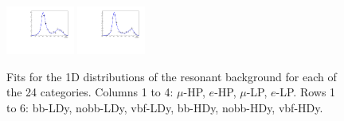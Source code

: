 \begin{figure}[htbp]
  \includegraphics[width=0.2\textwidth]{fig/2Dfit/LNuJJ_res_MJJ_mu_LP_vbf_HDy.pdf}
  \includegraphics[width=0.2\textwidth]{fig/2Dfit/LNuJJ_res_MJJ_e_LP_vbf_HDy.pdf}\\
  \caption{
    Fits for the 1D \MJ distributions of the resonant background for each of the 24 categories.
    Columns 1 to 4: $\mu$-HP, $e$-HP, $\mu$-LP, $e$-LP.
    Rows 1 to 6: bb-LDy, nobb-LDy, vbf-LDy, bb-HDy, nobb-HDy, vbf-HDy.
  }
  \label{fig:fits_res_MJJ_Run2}
\end{figure}

